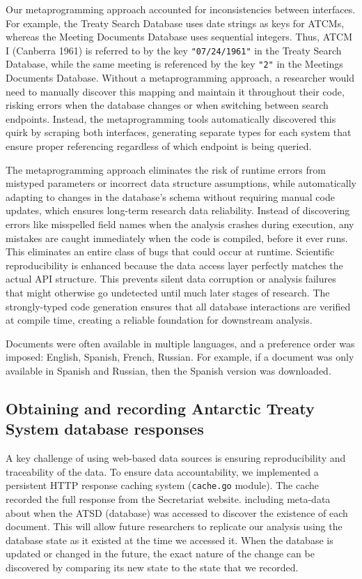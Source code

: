 \documentclass[12pt]{article}
\begin{document}
Our metaprogramming approach accounted for inconsistencies between interfaces.
For example, 
the Treaty Search Database uses date strings as keys for ATCMs, 
whereas the Meeting Documents Database uses sequential integers. 
Thus, ATCM I (Canberra 1961) is referred to by the key {\tt "07/24/1961"} in the Treaty Search Database, 
while the same meeting is referenced by the key {\tt "2"} in the Meetings Documents Database.
Without a metaprogramming approach, 
a researcher would need to manually discover this mapping and maintain it throughout their code,
risking errors when the database changes or when switching between search endpoints.
Instead, 
the metaprogramming tools automatically discovered this quirk by scraping both interfaces, 
generating separate types for each system that ensure proper referencing regardless of which endpoint is being queried.

The metaprogramming approach eliminates the risk of runtime errors from mistyped parameters or incorrect data structure assumptions,
while automatically adapting to changes in the database's schema without requiring manual code updates,
which ensures long-term research data reliability.
Instead of discovering errors like misspelled field names when the analysis crashes during execution, 
any mistakes are caught immediately when the code is compiled, before it ever runs. 
This eliminates an entire class of bugs that could occur at runtime.
Scientific reproducibility is enhanced because the data access layer perfectly matches the actual API structure. 
This prevents silent data corruption or analysis failures that might otherwise go undetected until much later stages of research. 
The strongly-typed code generation ensures that all database interactions are verified at compile time, creating a reliable foundation for downstream analysis.

Documents were often available in multiple languages, 
and a preference order was imposed: English, Spanish, French, Russian.
For example, if a document was only available in Spanish and Russian, then the Spanish version was downloaded. 

\subsection{Obtaining and recording Antarctic Treaty System database responses}
\label{http_cache}

A key challenge of using web-based data sources is ensuring reproducibility and traceability of the data.
To ensure data accountability,
we implemented a persistent HTTP response caching system ({\tt cache.go} module).
The cache recorded the full response from the Secretariat website.
including meta-data about when the ATSD (database) was accessed to discover the existence of each document.
This will allow future researchers to replicate our analysis using the database state as it existed at the time we accessed it.
When the database is updated or changed in the future, 
the exact nature of the change can be discovered by comparing its new state to the state that we recorded.
\end{document}
